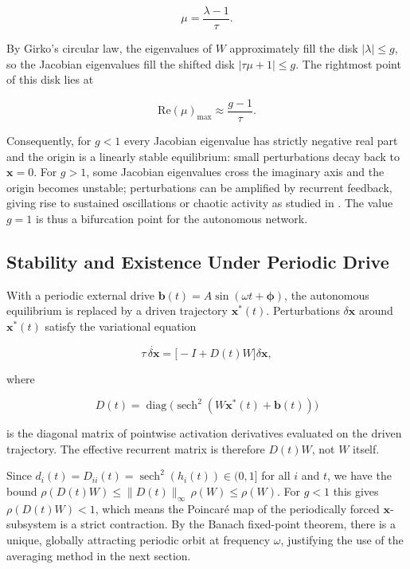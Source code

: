 \documentclass[paper=a4, fontsize=11pt]{scrartcl} %
\numberwithin{equation}{section} %
\numberwithin{figure}{section} %
\numberwithin{table}{section} %
\begin{document}
\begin{equation}
    \mu = \frac{\lambda - 1}{\tau}.
\end{equation}

By Girko's circular law, the eigenvalues of $W$ approximately fill the disk
$|\lambda| \leq g$, so the Jacobian eigenvalues fill the shifted disk
$|\tau\mu + 1| \leq g$.  The rightmost point of this disk lies at

\begin{equation}
    \mathrm{Re}(\mu)_{\max} \approx \frac{g-1}{\tau}.
\end{equation}

Consequently, for $g < 1$ every Jacobian eigenvalue has strictly negative real part
and the origin is a linearly stable equilibrium: small perturbations decay back to
$\mathbf{x}=0$.  For $g > 1$, some Jacobian eigenvalues cross the imaginary axis and
the origin becomes unstable; perturbations can be amplified by recurrent feedback,
giving rise to sustained oscillations or chaotic activity as studied in
\cite{sompolinsky1988chaos}.  The value $g = 1$ is thus a bifurcation point for the
autonomous network.

\subsection{Stability and Existence Under Periodic Drive}

With a periodic external drive $\mathbf{b}(t) = A\sin(\omega t + \boldsymbol{\phi})$,
the autonomous equilibrium is replaced by a driven trajectory $\mathbf{x}^*(t)$.
Perturbations $\delta\mathbf{x}$ around $\mathbf{x}^*(t)$ satisfy the variational
equation

\begin{equation}
    \tau\,\dot{\delta\mathbf{x}} = \bigl[-I + D(t)W\bigr]\delta\mathbf{x},
    \label{eq:variational}
\end{equation}

where

\begin{equation}
    D(t) = \operatorname{diag}\!\bigl(\operatorname{sech}^2(W\mathbf{x}^*(t) + \mathbf{b}(t))\bigr)
\end{equation}

is the diagonal matrix of pointwise activation derivatives evaluated on the driven
trajectory.  The effective recurrent matrix is therefore $D(t)W$, not $W$ itself.

Since $d_i(t) = D_{ii}(t) = \operatorname{sech}^2(h_i(t)) \in (0,1]$ for all $i$ and
$t$, we have the bound $\rho(D(t)W) \leq \|D(t)\|_{\infty}\,\rho(W) \leq \rho(W)$.
For $g < 1$ this gives $\rho(D(t)W) < 1$, which means the Poincar\'{e} map of the
periodically forced $\mathbf{x}$-subsystem is a strict contraction.  By the Banach
fixed-point theorem, there is a unique, globally attracting periodic orbit at frequency
$\omega$, justifying the use of the averaging method in the next section.
\end{document}
